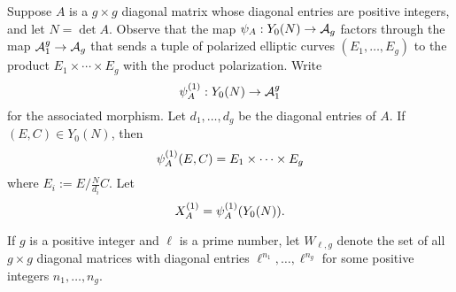 \documentclass{amsart}
\begin{document}
Suppose $A$ is a $g \times g$ diagonal matrix whose diagonal entries are positive integers, and let $N = \det A$. Observe that the map $\psi_{A}: Y_0(N) \to \mathcal{A}_g$ factors through the map $\mathcal{A}_1^g \to \mathcal{A}_g$ that sends a tuple of polarized elliptic curves $(E_1,\dots,E_g)$ to the product $E_1 \times \cdots \times E_g$ with the product polarization. Write
\[
\psi_{A}^{(1)}: Y_0(N) \to \mathcal{A}_1^g
\]
for the associated morphism. Let $d_1, \ldots, d_g$ be the diagonal entries of $A$. If $(E, C) \in Y_0(N)$, then
\[
  \psi_{A}^{(1)}(E,C) = E_1 \times \cdots \times E_g
\]
where  $E_i := E/\frac{N}{d_i}C$.
Let $$X^{(1)}_A = \psi_{A}^{(1)}(Y_0(N)).$$

  If $g$ is a positive integer and $\ell$ is a prime number, let $W_{\ell,g}$ denote the set of all $g \times g$ diagonal matrices with diagonal entries $\ell^{n_1},\dots,\ell^{n_g}$ for some positive integers $n_1,\dots,n_g$.
\end{document}
